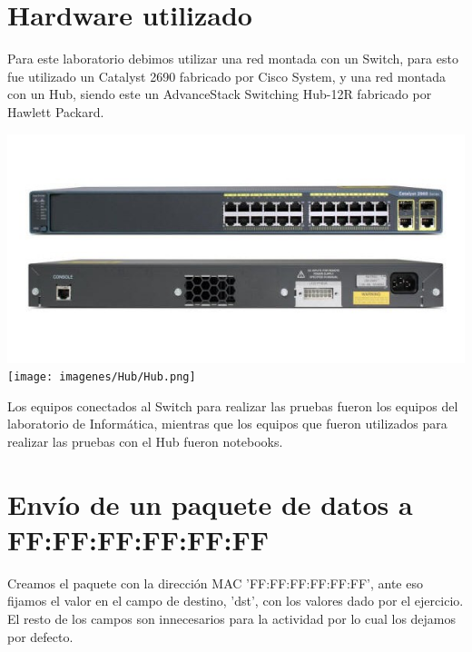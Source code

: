 \documentclass[spanish]{udpreport}
\begin{document}

\section{Hardware utilizado}

Para este laboratorio debimos utilizar una red montada con un Switch, para esto fue utilizado un Catalyst 2690 fabricado por Cisco System, y una red montada con un Hub, siendo este un AdvanceStack Switching Hub-12R fabricado por Hawlett Packard.

\begin{center}
	\includegraphics[scale=.5]{imagenes/Switch/switch.png}
	\texttt{[image: imagenes/Hub/Hub.png]}
	\linebreak
\end{center}

Los equipos conectados al Switch para realizar las pruebas fueron los equipos del laboratorio de Informática, mientras que los equipos que fueron utilizados para realizar las pruebas con el Hub fueron notebooks.

\newpage


\section{Envío de un paquete de datos a FF:FF:FF:FF:FF:FF}

Creamos el paquete con la dirección MAC 'FF:FF:FF:FF:FF:FF', ante eso fijamos el valor en el campo de destino, 'dst', con los valores dado por el ejercicio. El resto de los campos son innecesarios para la actividad por lo cual los dejamos por defecto.
\end{document}
